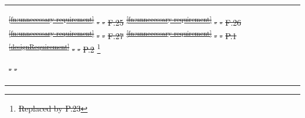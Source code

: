 \documentclass[a4paper,12pt,twoside]{article}
\providecommand{\DIFdeltex}[1]{{\protect\color{red}\sout{#1}}}                      %
\providecommand{\DIFdel}[1]{\texorpdfstring{\DIFdeltex{#1}}{}} %
\begin{document}
\begin{longtable}[]{|m{}| m{} |m{} |m{}|m{}|}
\DIFdel{\textsuperscript{\ref{fn:unnecessary-requirement}}                                                                                          }%
\DIFdel{-        }%
\DIFdel{-            }%
\DIFdel{F.25 }%
\DIFdel{\textsuperscript{\ref{fn:unnecessary-requirement}}                                                                                         }%
\DIFdel{-        }%
\DIFdel{-            }%
\DIFdel{F.26 }%
\DIFdel{\textsuperscript{\ref{fn:unnecessary-requirement}}                                                                                     }%
\DIFdel{-        }%
\DIFdel{-            }%
\DIFdel{F.27 }%
\DIFdel{\textsuperscript{\ref{fn:unnecessary-requirement}}                                                                                    }%
\DIFdel{-        }%
\DIFdel{-            }%
\DIFdel{P.1  }%
\DIFdel{\textsuperscript{\ref{designRequirement}}                                                                                                                           }%
\DIFdel{-      }%
\DIFdel{-          }%
\DIFdel{P.2  }%
\footnote{\DIFdel{Replaced by P.23}%
}                                                                       %
\addtocounter{footnote}{-1}%
\DIFdel{-  }%
\DIFdel{-  }%

\end{longtable}
\end{document}
